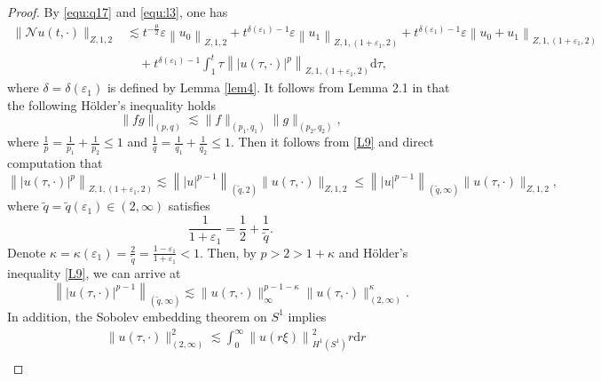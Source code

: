 \documentclass[11pt,twoside]{article}
\newcommand{\ve}{\varepsilon}
\newcommand{\f}{\frac}
\theoremstyle{plain}
\theoremstyle{definition}
\theoremstyle{remark}
\numberwithin{equation}{section}
\begin{document}
\begin{proof}
By \eqref{equ:q17} and \eqref{equ:l3}, one has
\begin{equation}\label{L8}
\begin{aligned}
\|\mathcal{N} u(t, \cdot)\|_{Z, 1, 2} &\lesssim t^{-\f{\mu}{2}}\ve\left\|u_0\right\|_{Z, 1, 2}
+t^{\delta(\varepsilon_1)-1}\ve\left\|u_1\right\|_{Z, 1,(1+\varepsilon_1, 2)}
+t^{\delta(\varepsilon_1)-1}\ve\left\|u_0+u_1\right\|_{Z, 1,(1+\varepsilon_1, 2)}\\
&\quad+ t^{\delta(\varepsilon_1)-1}\int_{1}^{t} \tau\left\||u(\tau, \cdot)|^p\right\|_{Z, 1,(1+\varepsilon_1, 2)}\mathrm{d}\tau,
\end{aligned}
\end{equation}
where $\delta=\delta(\varepsilon_1)$ is defined by Lemma \ref{lem4}. It follows from Lemma 2.1 in \cite{LX} that
the following H\"{o}lder's inequality holds
\begin{equation}\label{L9}
\|fg\|_{(p,q)}\lesssim\|f\|_{(p_1, q_1)}\|g\|_{(p_2, q_2)},
\end{equation}
where $\f{1}{p}=\f{1}{p_1}+\f{1}{p_2}\leq 1$ and $\f{1}{q}=\f{1}{q_1}+\f{1}{q_2}\leq 1$.
Then it follows from \eqref{L9} and  direct computation that
\begin{equation}\label{L13}
\left\||u(\tau, \cdot)|^p\right\|_{Z, 1,(1+\varepsilon_1, 2)} \lesssim\left\||u|^{p-1}\right\|_{(\tilde{q}, 2)}\|u(\tau, \cdot)\|_{Z, 1,2}\leq \left\||u|^{p-1}\right\|_{(\tilde{q}, \infty)}\|u(\tau, \cdot)\|_{Z, 1,2},
\end{equation}
where $\tilde{q}=\tilde{q}(\varepsilon_1)\in(2, \infty)$ satisfies
\begin{equation}\label{L14-1}
\f{1}{1+\varepsilon_1}=\f{1}{2}+\f{1}{\tilde{q}}.
\end{equation}
Denote  $\kappa=\kappa(\varepsilon_1)=\f{2}{\tilde{q}}=\f{1-\varepsilon_1}{1+\varepsilon_1}<1$.
Then, by $p>2>1+\kappa$ and H\"{o}lder's inequality \eqref{L9}, we can arrive at
\begin{equation}\label{L10}
\left\||u(\tau, \cdot)|^{p-1}\right\|_{(\tilde{q}, \infty)} \lesssim\|u(\tau, \cdot)\|_{\infty}^{p-1-\kappa}\|u(\tau, \cdot)\|_{(2, \infty)}^\kappa.
\end{equation}
In addition, the Sobolev embedding theorem on $S^1$ implies
\begin{equation}\label{L11}
\begin{aligned}
& \|u(\tau, \cdot)\|_{(2, \infty)}^2 \lesssim \int_0^{\infty}\left\|u(r\xi)\right\|_{H^{1}\left(S^{1}\right)}^2 r \mathrm{d} r \\

\end{aligned}
\end{equation}
\end{proof}
\end{document}
